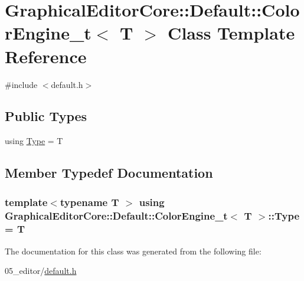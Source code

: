 \hypertarget{classGraphicalEditorCore_1_1Default_1_1ColorEngine__t}{}\section{Graphical\+Editor\+Core\+:\+:Default\+:\+:Color\+Engine\+\_\+t$<$ T $>$ Class Template Reference}
\label{classGraphicalEditorCore_1_1Default_1_1ColorEngine__t}


{\ttfamily \#include $<$default.\+h$>$}

\subsection*{Public Types}
\begin{DoxyCompactItemize}
\item 
using \hyperlink{classGraphicalEditorCore_1_1Default_1_1ColorEngine__t_aefae5eac83e1674f3d2d263e11739e5d}{Type} = T
\end{DoxyCompactItemize}


\subsection{Member Typedef Documentation}
\subsubsection[{\texorpdfstring{Type}{Type}}]{\setlength{\rightskip}{0pt plus 5cm}template$<$typename T $>$ using {\bf Graphical\+Editor\+Core\+::\+Default\+::\+Color\+Engine\+\_\+t}$<$ T $>$\+::{\bf Type} =  T}\hypertarget{classGraphicalEditorCore_1_1Default_1_1ColorEngine__t_aefae5eac83e1674f3d2d263e11739e5d}{}\label{classGraphicalEditorCore_1_1Default_1_1ColorEngine__t_aefae5eac83e1674f3d2d263e11739e5d}


The documentation for this class was generated from the following file\+:\begin{DoxyCompactItemize}
\item 
05\+\_\+editor/\hyperlink{default_8h}{default.\+h}\end{DoxyCompactItemize}
